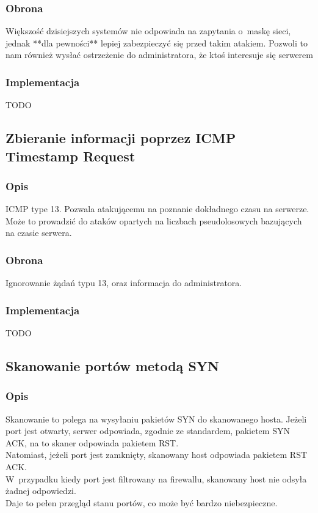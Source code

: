 \documentclass[a4paper,10pt]{article}
\begin{document}
		\subsubsection{Obrona}
			Większość dzisiejszych systemów nie odpowiada na zapytania o~maskę sieci, jednak **dla pewności** lepiej zabezpieczyć się przed takim atakiem. Pozwoli to nam również wysłać ostrzeżenie do administratora, że ktoś interesuje się serwerem
		\subsubsection{Implementacja}
			TODO
	\subsection{Zbieranie informacji poprzez ICMP Timestamp Request}
		\subsubsection{Opis}
			ICMP type 13. Pozwala atakującemu na poznanie dokładnego czasu na serwerze. Może to prowadzić do ataków opartych na liczbach pseudolosowych bazujących na czasie serwera.
		\subsubsection{Obrona}
			Ignorowanie żądań typu 13, oraz informacja do administratora.
		\subsubsection{Implementacja}
			TODO
	\subsection{Skanowanie portów metodą SYN}
		\subsubsection{Opis}
			Skanowanie to polega na wysyłaniu pakietów SYN do skanowanego hosta. Jeżeli port jest otwarty, serwer odpowiada, zgodnie ze standardem, pakietem SYN ACK, na to skaner odpowiada pakietem RST.\\
			Natomiast, jeżeli port jest zamknięty, skanowany host odpowiada pakietem RST ACK.\\
			W~przypadku kiedy port jest filtrowany na firewallu, skanowany host nie odsyła żadnej odpowiedzi.\\
			Daje to pełen przegląd stanu portów, co może być bardzo niebezpieczne.
\end{document}
